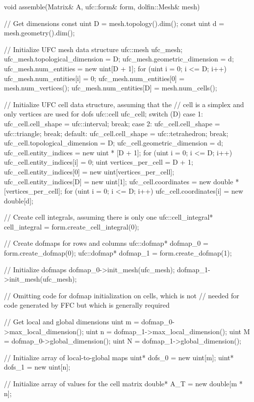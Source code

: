 \begin{c++}
void assemble(Matrix& A, ufc::form& form, dolfin::Mesh& mesh)
{
  // Get dimensions
  const uint D = mesh.topology().dim();
  const uint d = mesh.geometry().dim();

  // Initialize UFC mesh data structure
  ufc::mesh ufc_mesh;
  ufc_mesh.topological_dimension = D;
  ufc_mesh.geometric_dimension = d;
  ufc_mesh.num_entities = new uint[D + 1];
  for (uint i = 0; i <= D; i++)
    ufc_mesh.num_entities[i] = 0;
  ufc_mesh.num_entities[0] = mesh.num_vertices();
  ufc_mesh.num_entities[D] = mesh.num_cells();

  // Initialize UFC cell data structure, assuming that the
  // cell is a simplex and only vertices are used for dofs
  ufc::cell ufc_cell;
  switch (D)
  {
  case 1:
    ufc_cell.cell_shape = ufc::interval;
    break;
  case 2:
    ufc_cell.cell_shape = ufc::triangle;
    break;
  default:
    ufc_cell.cell_shape = ufc::tetrahedron;
    break;
  }
  ufc_cell.topological_dimension = D;
  ufc_cell.geometric_dimension = d;
  ufc_cell.entity_indices = new uint * [D + 1];
  for (uint i = 0; i <= D; i++)
    ufc_cell.entity_indices[i] = 0;
  uint vertices_per_cell = D + 1;
  ufc_cell.entity_indices[0] = new uint[vertices_per_cell];
  ufc_cell.entity_indices[D] = new uint[1];
  ufc_cell.coordinates = new double * [vertices_per_cell];
  for (uint i = 0; i <= D; i++)
    ufc_cell.coordinates[i] = new double[d];

  // Create cell integrals, assuming there is only one
  ufc::cell_integral* cell_integral = form.create_cell_integral(0);

  // Create dofmaps for rows and columns
  ufc::dofmap* dofmap_0 = form.create_dofmap(0);
  ufc::dofmap* dofmap_1 = form.create_dofmap(1);

  // Initialize dofmaps
  dofmap_0->init_mesh(ufc_mesh);
  dofmap_1->init_mesh(ufc_mesh);

  // Omitting code for dofmap initialization on cells, which is not
  // needed for code generated by FFC but which is generally required

  // Get local and global dimensions
  uint m = dofmap_0->max_local_dimension();
  uint n = dofmap_1->max_local_dimension();
  uint M = dofmap_0->global_dimension();
  uint N = dofmap_1->global_dimension();

  // Initialize array of local-to-global maps
  uint* dofs_0 = new uint[m];
  uint* dofs_1 = new uint[n];

  // Initialize array of values for the cell matrix
  double* A_T = new double[m * n];

}
\end{c++}

